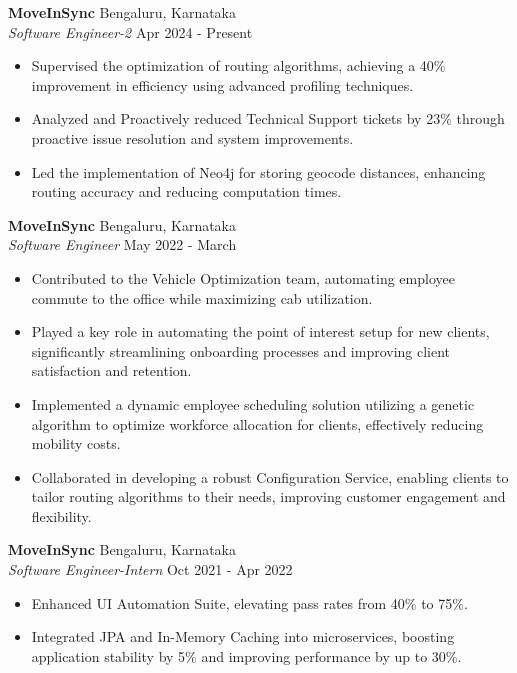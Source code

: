 \documentclass[a4paper]{article}
\begin{document}
\textbf{MoveInSync} \hfill Bengaluru, Karnataka\\
\textit{Software Engineer-2} \hfill Apr 2024 - Present\\
\vspace{-1mm}
\begin{itemize} \itemsep 0pt
    \item Supervised the optimization of routing algorithms, achieving a 40\% improvement in efficiency using advanced profiling techniques.
    \item Analyzed and Proactively reduced Technical Support tickets by 23\% through proactive issue resolution and system improvements.
    \item Led the implementation of Neo4j for storing geocode distances, enhancing routing accuracy and reducing computation times.
\end{itemize}
\textbf{MoveInSync} \hfill Bengaluru, Karnataka\\
\textit{Software Engineer} \hfill May 2022 - March\\
\vspace{-1mm}
\begin{itemize} \itemsep 0pt
	\item Contributed to the Vehicle Optimization team, automating employee commute to the office while maximizing cab utilization.
    \item Played a key role in automating the point of interest setup for new clients, significantly streamlining onboarding processes and improving client satisfaction and retention.
	\item Implemented a dynamic employee scheduling solution utilizing a genetic algorithm to optimize workforce allocation for clients, effectively reducing mobility costs.
\item Collaborated in developing a robust Configuration Service, enabling clients to tailor routing algorithms to their needs, improving customer engagement and flexibility.
\end{itemize}
\textbf{MoveInSync} \hfill Bengaluru, Karnataka\\
\textit{Software Engineer-Intern} \hfill Oct 2021 - Apr 2022\\
\vspace{-1mm}
\begin{itemize} \itemsep 0pt
	\item Enhanced UI Automation Suite, elevating pass rates from 40\% to 75\%.
	\item Integrated JPA and In-Memory Caching into microservices, boosting application stability by 5\% and improving performance by up to 30\%.
\end{itemize}
\end{document}
